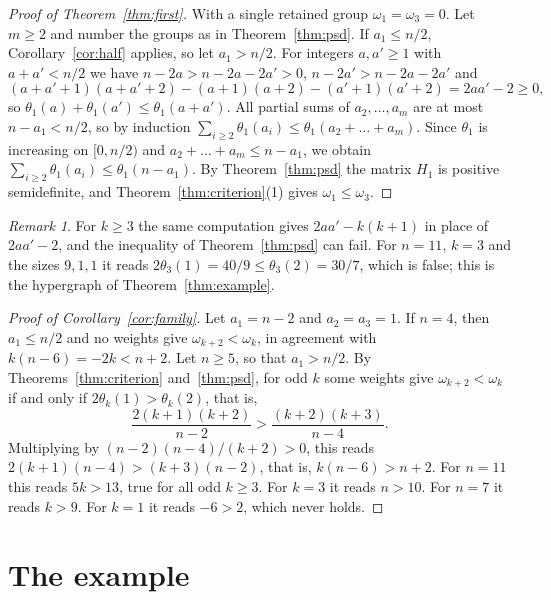 \documentclass[11pt]{amsart}
\theoremstyle{remark}
\newtheorem{rem}[thm]{Remark}
\numberwithin{equation}{section}
\begin{document}
\begin{proof}[Proof of Theorem~\ref{thm:first}]
With a single retained group $\omega_1=\omega_3=0$. Let $m\ge2$ and number the groups as in Theorem~\ref{thm:psd}. If $a_1\le n/2$, Corollary~\ref{cor:half} applies, so let $a_1>n/2$. For integers $a,a'\ge1$ with $a+a'<n/2$ we have $n-2a>n-2a-2a'>0$, $n-2a'>n-2a-2a'$ and
\[
(a+a'+1)(a+a'+2)-(a+1)(a+2)-(a'+1)(a'+2)=2aa'-2\ge0,
\]
so $\theta_1(a)+\theta_1(a')\le\theta_1(a+a')$. All partial sums of $a_2,\dots,a_m$ are at most $n-a_1<n/2$, so by induction $\sum_{i\ge2}\theta_1(a_i)\le\theta_1(a_2+\dots+a_m)$. Since $\theta_1$ is increasing on $[0,n/2)$ and $a_2+\dots+a_m\le n-a_1$, we obtain $\sum_{i\ge2}\theta_1(a_i)\le\theta_1(n-a_1)$. By Theorem~\ref{thm:psd} the matrix $H_1$ is positive semidefinite, and Theorem~\ref{thm:criterion}(1) gives $\omega_1\le\omega_3$.
\end{proof}

\begin{rem}\label{rem:first}
For $k\ge3$ the same computation gives $2aa'-k(k+1)$ in place of $2aa'-2$, and the inequality of Theorem~\ref{thm:psd} can fail. For $n=11$, $k=3$ and the sizes $9,1,1$ it reads $2\theta_3(1)=40/9\le\theta_3(2)=30/7$, which is false; this is the hypergraph of Theorem~\ref{thm:example}.
\end{rem}

\begin{proof}[Proof of Corollary~\ref{cor:family}]
Let $a_1=n-2$ and $a_2=a_3=1$. If $n=4$, then $a_1\le n/2$ and no weights give $\omega_{k+2}<\omega_k$, in agreement with $k(n-6)=-2k<n+2$. Let $n\ge5$, so that $a_1>n/2$. By Theorems~\ref{thm:criterion} and~\ref{thm:psd}, for odd $k$ some weights give $\omega_{k+2}<\omega_k$ if and only if $2\theta_k(1)>\theta_k(2)$, that is,
\[
\frac{2(k+1)(k+2)}{n-2}>\frac{(k+2)(k+3)}{n-4}.
\]
Multiplying by $(n-2)(n-4)/(k+2)>0$, this reads $2(k+1)(n-4)>(k+3)(n-2)$, that is, $k(n-6)>n+2$. For $n=11$ this reads $5k>13$, true for all odd $k\ge3$. For $k=3$ it reads $n>10$. For $n=7$ it reads $k>9$. For $k=1$ it reads $-6>2$, which never holds.
\end{proof}

\section{The example}\label{sec:example}
\end{document}
